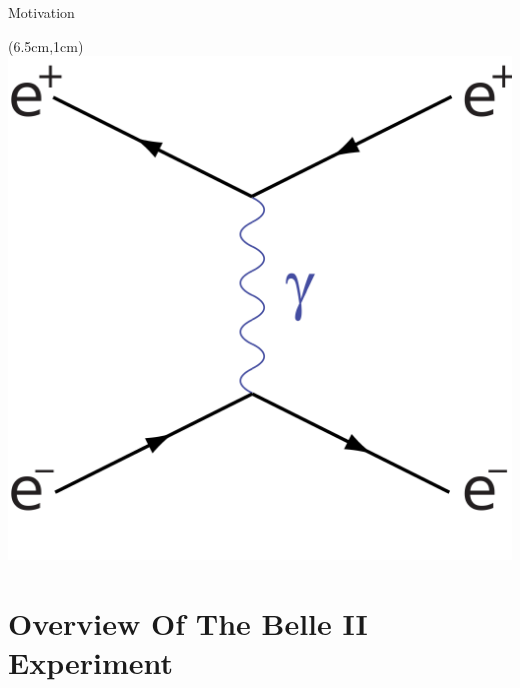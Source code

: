 \documentclass[8pt]{beamer}
\begin{document}
\begin{frame}{Motivation}
\begin{textblock*}{3cm}(6.5cm,1cm)
	\includegraphics[width=\textwidth]{VBilder/bhabhaT}
\end{textblock*}


\end{frame}


\section{Overview Of The Belle II Experiment}
\end{document}
